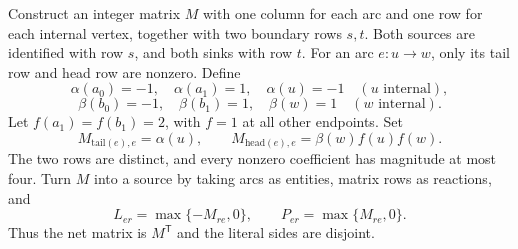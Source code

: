 \documentclass[11pt,a4paper]{article}
\begin{document}
Construct an integer matrix $M$ with one column for each arc and one row
for each internal vertex, together with two boundary rows $s,t$. Both
sources are identified with row $s$, and both sinks with row $t$. For an
arc $e:u\to w$, only its tail row and head row are nonzero. Define
\[
 \alpha(a_0)=-1,\quad\alpha(a_1)=1,\quad\alpha(u)=-1
 \quad(u\text{ internal}),
\]
\[
 \beta(b_0)=-1,\quad\beta(b_1)=1,\quad\beta(w)=1
 \quad(w\text{ internal}).
\]
Let $f(a_1)=f(b_1)=2$, with $f=1$ at all other endpoints. Set
\begin{equation}\label{eq:arc}
 M_{\mathrm{tail}(e),e}=\alpha(u),\qquad
 M_{\mathrm{head}(e),e}=\beta(w)f(u)f(w).
\end{equation}
The two rows are distinct, and every nonzero coefficient has magnitude at
most four. Turn $M$ into a source by taking arcs as entities, matrix rows
as reactions, and
\begin{equation}\label{eq:source}
 L_{er}=\max\{-M_{re},0\},\qquad
 P_{er}=\max\{M_{re},0\}.
\end{equation}
Thus the net matrix is $M^{\mathsf T}$ and the literal sides are disjoint.
\end{document}
